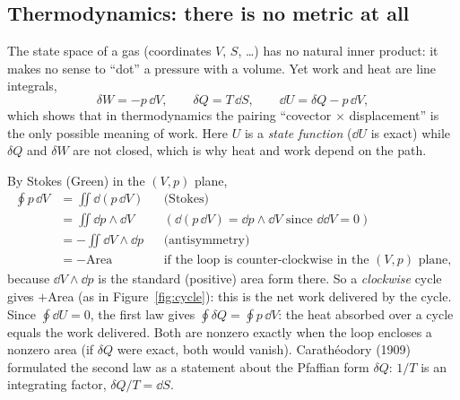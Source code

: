 \subsection{Thermodynamics: there is no metric at all}\label{sec:phys-thermo}

The state space of a gas (coordinates $V$, $S$, \dots) has no natural inner product: it makes no sense to ``dot'' a pressure with a volume. Yet work and heat are line integrals,
\begin{equation}\label{eq:thermo}
\delta W=-p\,\dd V,\qquad\delta Q=T\,\dd S,\qquad\dd U=\delta Q-p\,\dd V,
\end{equation}
which shows that in thermodynamics the pairing ``covector $\times$ displacement'' is the only possible meaning of work. Here $U$ is a \emph{state function} ($\dd U$ is exact) while $\delta Q$ and $\delta W$ are not closed, which is why heat and work depend on the path.



By Stokes (Green) in the $(V,p)$ plane,
\begin{align*}
\oint p\,\dd V&=\iint\dd(p\,\dd V) &&\text{(Stokes)}\\
&=\iint\dd p\wedge\dd V &&(\dd(p\,\dd V)=\dd p\wedge\dd V\text{ since }\dd\dd V=0)\\
&=-\iint\dd V\wedge\dd p &&\text{(antisymmetry)}\\
&=-\text{Area} &&\text{if the loop is counter-clockwise in the $(V,p)$ plane,}
\end{align*}
because $\dd V\wedge\dd p$ is the standard (positive) area form there. So a \emph{clockwise} cycle gives $+$Area (as in Figure~\ref{fig:cycle}): this is the net work delivered by the cycle. Since $\oint\dd U=0$, the first law gives $\oint\delta Q=\oint p\,\dd V$: the heat absorbed over a cycle equals the work delivered. Both are nonzero exactly when the loop encloses a nonzero area (if $\delta Q$ were exact, both would vanish).
Carath\'eodory (1909) \cite{Caratheodory} formulated the second law as a statement about the Pfaffian form $\delta Q$: $1/T$ is an integrating factor, $\delta Q/T=\dd S$.
